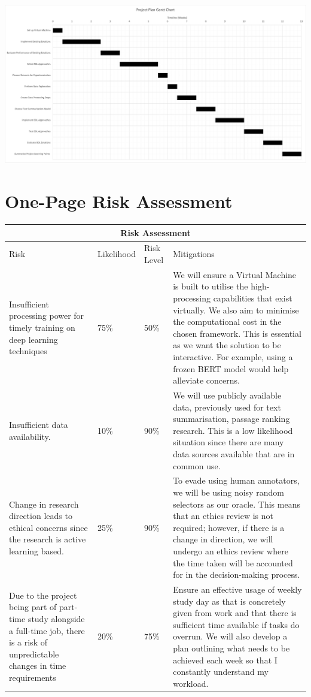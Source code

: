 \documentclass[ %
                    author={James Stephenson},
                supervisor={Dr. Edwin Simpson},
                    degree={MSc},
                     title={Project Plan: Bayesian Deep Learning For Extractive Test Summarisation},
                  subtitle={},
                      type={},
                      year={2022}]{../additions/dissertation}
\begin{document}
		\begin{center}
			\includegraphics[width=\textwidth,height=\textheight,keepaspectratio]{Gantt.png}
		\end{center}
		
	\chapter{One-Page Risk Assessment}
		\label{appx:riskassessment}
		
		\begin{tabular}{ |p{5cm}||p{2cm}|p{2cm}|p{6cm}|  }
 			\hline
 			\multicolumn{4}{|c|}{Risk Assessment} \\
			\hline
 			Risk& Likelihood &Risk Level&Mitigations\\
 			\hline
 			Insufficient processing power for timely training on deep learning techniques   & 75\%    &50\%&  We will ensure a Virtual Machine is built to utilise the high-processing capabilities that exist virtually. We also aim to minimise the computational cost in the chosen framework. This is essential as we want the solution to be interactive. For example, using a frozen BERT model would help alleviate concerns. \\
			\hline
 			Insufficient data availability.&10\% & 90\%  & We will use publicly available data, previously used for text summarisation, passage ranking research. This is a low likelihood situation since there are many data sources available that are in common use. \\
			\hline
 			Change in research direction leads to ethical concerns since the research is active learning based. &25\% & 90\%& To evade using human annotators, we will be using noisy random selectors as our oracle. This means that an ethics review is not required; however, if there is a change in direction, we will undergo an ethics review where the time taken will be accounted for in the decision-making process.\\
			\hline
 			Due to the project being part of part-time study alongside a full-time job, there is a risk of unpredictable changes in time requirements    &20\% & 75\%& Ensure an effective usage of weekly study day as that is concretely given from work and that there is sufficient time available if tasks do overrun. We will also develop a plan outlining what needs to be achieved each week so that I constantly understand my workload.\\
 			\hline
		\end{tabular}
		
\end{document}
